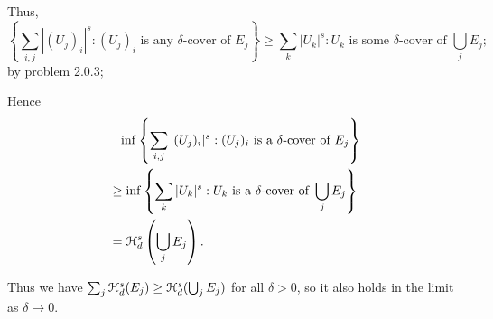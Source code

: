 \begin{enumerate}
    Thus, 
    \[ \left\{ \sum_{i,j} |(U_j)_i|^s : (U_j)_i \text{ is any }\delta\text{-cover of } E_j \right\} \geq  \sum_{k} |U_k|^s: U_k  \text{ is some }\delta\text{-cover of } \bigcup_j E_j;\]
    by problem 2.0.3;
    
    Hence
    \begin{align*}
        &\phantom{\geq} \inf \left\{ \sum_{i,j} |(U_j)_i|^s : (U_j)_i \text{ is a }\delta\text{-cover of } E_j \right\} \\
        &\geq \inf \left\{\sum_k |U_k|^s: U_k  \text{ is a }\delta\text{-cover of } \bigcup_j E_j\right\}\\
        &= \mathcal{H}_d^s\left(\bigcup_j E_j\right).
    \end{align*}
    
    Thus we have \(\sum_j \mathcal{H}_d^s(E_j) \geq  \mathcal{H}_d^s(\bigcup_j E_j)\) for all \(\delta > 0\), so it also holds in the limit as \(\delta \to 0\).

\end{enumerate}
